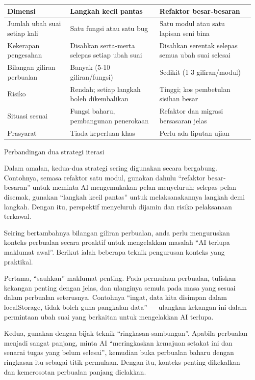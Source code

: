 \begin{center}
\begin{tabularx}{\linewidth}{|X|X|X|}
\hline
\textbf{Dimensi} & \textbf{Langkah kecil pantas} & \textbf{Refaktor besar-besaran} \tabularnewline
\hline
Jumlah ubah suai setiap kali & Satu fungsi atau satu bug & Satu modul atau satu lapisan seni bina \tabularnewline
Kekerapan pengesahan & Disahkan serta-merta selepas setiap ubah suai & Disahkan serentak selepas semua ubah suai selesai \tabularnewline
Bilangan giliran perbualan & Banyak (5-10 giliran/fungsi) & Sedikit (1-3 giliran/modul) \tabularnewline
Risiko & Rendah; setiap langkah boleh dikembalikan & Tinggi; kos pembetulan sisihan besar \tabularnewline
Situasi sesuai & Fungsi baharu, pembangunan penerokaan & Refaktor dan migrasi bersasaran jelas \tabularnewline
Prasyarat & Tiada keperluan khas & Perlu ada liputan ujian \tabularnewline
\hline
\end{tabularx}
\end{center}

\begin{center}\small\color{gray}Perbandingan dua strategi iterasi\end{center}

Dalam amalan, kedua-dua strategi sering digunakan secara bergabung. Contohnya, semasa refaktor satu modul, gunakan dahulu “refaktor besar-besaran” untuk meminta AI mengemukakan pelan menyeluruh; selepas pelan disemak, gunakan “langkah kecil pantas” untuk melaksanakannya langkah demi langkah. Dengan itu, perspektif menyeluruh dijamin dan risiko pelaksanaan terkawal.


Seiring bertambahnya bilangan giliran perbualan, anda perlu menguruskan konteks perbualan secara proaktif untuk mengelakkan masalah “AI terlupa maklumat awal”. Berikut ialah beberapa teknik pengurusan konteks yang praktikal.

Pertama, “sauhkan” maklumat penting. Pada permulaan perbualan, tuliskan kekangan penting dengan jelas, dan ulanginya semula pada masa yang sesuai dalam perbualan seterusnya. Contohnya “ingat, data kita disimpan dalam localStorage, tidak boleh guna pangkalan data” — ulangkan kekangan ini dalam permintaan ubah suai yang berkaitan untuk mengelakkan AI terlupa.

Kedua, gunakan dengan bijak teknik “ringkasan-sambungan”. Apabila perbualan menjadi sangat panjang, minta AI “meringkaskan kemajuan setakat ini dan senarai tugas yang belum selesai”, kemudian buka perbualan baharu dengan ringkasan itu sebagai titik permulaan. Dengan itu, konteks penting dikekalkan dan kemerosotan perbualan panjang dielakkan.

